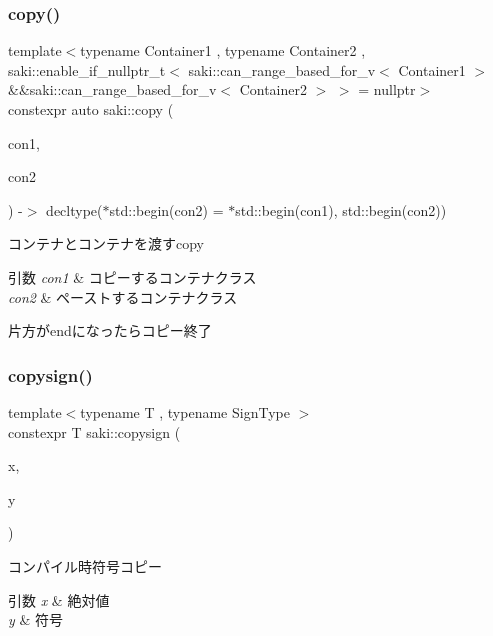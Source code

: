 \subsubsection{\texorpdfstring{copy()}{copy()}}
{\footnotesize\ttfamily template$<$typename Container1 , typename Container2 , saki\+::enable\+\_\+if\+\_\+nullptr\+\_\+t$<$ saki\+::can\+\_\+range\+\_\+based\+\_\+for\+\_\+v$<$ Container1 $>$ \&\&saki\+::can\+\_\+range\+\_\+based\+\_\+for\+\_\+v$<$ Container2 $>$ $>$  = nullptr$>$ \\
constexpr auto saki\+::copy (\begin{DoxyParamCaption}\item[{const Container1 \&}]{con1,  }\item[{Container2 \&}]{con2 }\end{DoxyParamCaption}) -\/$>$ decltype($\ast$std\+::begin(con2) = $\ast$std\+::begin(con1), std\+::begin(con2))
}



コンテナとコンテナを渡すcopy 


\begin{DoxyParams}{引数}
{\em con1} & コピーするコンテナクラス \\
\hline
{\em con2} & ペーストするコンテナクラス\\
\hline
\end{DoxyParams}
片方がendになったらコピー終了 \mbox{\label{namespacesaki_a8bab6303ac2144b883080f04ebe26a0e}} 
\subsubsection{\texorpdfstring{copysign()}{copysign()}}
{\footnotesize\ttfamily template$<$typename T , typename Sign\+Type $>$ \\
constexpr T saki\+::copysign (\begin{DoxyParamCaption}\item[{const T \&}]{x,  }\item[{const Sign\+Type \&}]{y }\end{DoxyParamCaption})}



コンパイル時符号コピー 


\begin{DoxyParams}{引数}
{\em x} & 絶対値 \\
\hline
{\em y} & 符号 \\
\hline
\end{DoxyParams}
\mbox{\label{namespacesaki_a82551963a8cab889ca6f76ed346d6f4f}} 
